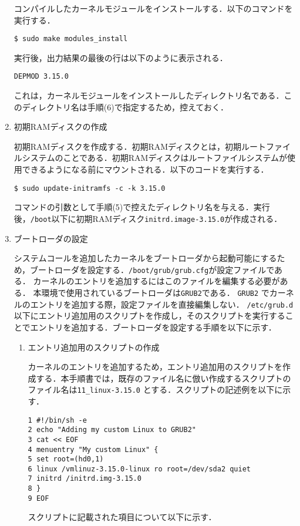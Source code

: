 \documentclass[12pt]{jsarticle}
\begin{document}
\begin{enumerate}
コンパイルしたカーネルモジュールをインストールする．以下のコマンドを実行する．
\begin{verbatim}
$ sudo make modules_install
\end{verbatim}
実行後，出力結果の最後の行は以下のように表示される．
\begin{verbatim}
DEPMOD 3.15.0
\end{verbatim}
これは，カーネルモジュールをインストールしたディレクトリ名である．このディレクトリ名は手順(6)で指定するため，控えておく．

\item 初期RAMディスクの作成

初期RAMディスクを作成する．初期RAMディスクとは，初期ルートファイルシステムのことである．初期RAMディスクはルートファイルシステムが使用できるようになる前にマウントされる．以下のコードを実行する．
\begin{verbatim}
$ sudo update-initramfs -c -k 3.15.0
\end{verbatim}
コマンドの引数として手順(5)で控えたディレクトリ名を与える．実行後，\verb|/boot|以下に初期RAMディスク\verb|initrd.image-3.15.0|が作成される．

\item ブートローダの設定

システムコールを追加したカーネルをブートローダから起動可能にするため，ブートローダを設定する．\verb|/boot/grub/grub.cfg|が設定ファイルである．
カーネルのエントリを追加するにはこのファイルを編集する必要がある．
本環境で使用されているブートローダは\verb|GRUB2|である．
\verb|GRUB2| でカーネルのエントリを追加する際，設定ファイルを直接編集しない． \verb|/etc/grub.d| 以下にエントリ追加用のスクリプトを作成し，そのスクリプトを実行することでエントリを追加する．ブートローダを設定する手順を以下に示す．


\begin{enumerate}
\item エントリ追加用のスクリプトの作成

カーネルのエントリを追加するため，エントリ追加用のスクリプトを作成する．本手順書では，既存のファイル名に倣い作成するスクリプトのファイル名は\verb|11_linux-3.15.0| とする．スクリプトの記述例を以下に示す．
\begin{verbatim}
1 #!/bin/sh -e
2 echo "Adding my custom Linux to GRUB2"
3 cat << EOF
4 menuentry "My custom Linux" {
5 set root=(hd0,1)
6 linux /vmlinuz-3.15.0-linux ro root=/dev/sda2 quiet
7 initrd /initrd.img-3.15.0
8 }
9 EOF
\end{verbatim}
スクリプトに記載された項目について以下に示す．


\end{enumerate}
\end{enumerate}
\end{document}
